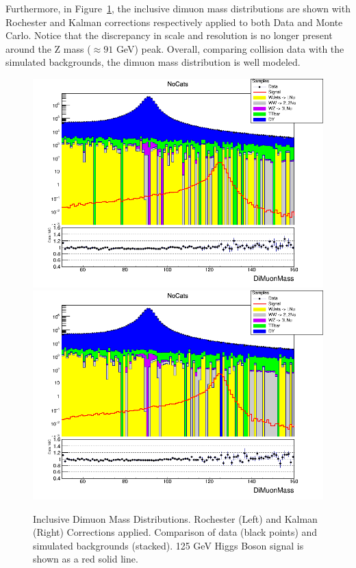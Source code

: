 Furthermore, in Figure~\ref{fig:higgs_selections_inclusivemass}, the inclusive dimuon mass distributions are shown with Rochester and Kalman corrections respectively applied to both Data and Monte Carlo. Notice that the discrepancy in scale and resolution is no longer present around the Z mass ($\approx 91$ GeV) peak. Overall, comparing collision data with the simulated backgrounds, the dimuon mass distribution is well modeled.
\begin{figure}[htbp]
  \centering
  \includegraphics[width=0.9\linewidth]{figures/ch_higgs/distributions/baseline_rochester/distribution__NoCats__DiMuonMass__logY.png}\\
  \includegraphics[width=0.9\linewidth]{figures/ch_higgs/distributions/baseline_kalman/distribution__NoCats__DiMuonMass__logY.png}
  \caption{Inclusive Dimuon Mass Distributions. Rochester (Left) and Kalman (Right) Corrections applied. Comparison of data (black points) and simulated backgrounds (stacked). 125 GeV Higgs Boson signal is shown as a red solid line.}
  \label{fig:higgs_selections_inclusivemass}
\end{figure}



